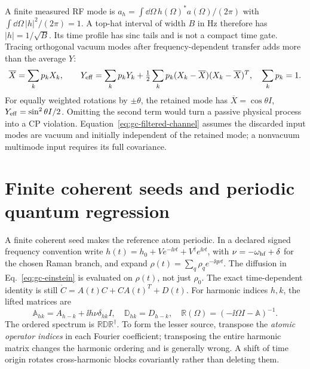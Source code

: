 A finite measured RF mode is
$a_h=\int\dd\Omega\,h(\Omega)^*a(\Omega)/(2\pi)$ with
$\int\dd\Omega\,|h|^2/(2\pi)=1$. A top-hat interval of width $B$ in Hz
therefore has $|h|=1/\sqrt B$. Its time profile has sinc tails and is not a
compact time gate. Tracing orthogonal vacuum modes after frequency-dependent
transfer adds more than the average $Y$:
\begin{equation}
 \overline X=\sum_kp_kX_k,\qquad
 Y_{\rm eff}=\sum_kp_kY_k+\tfrac12\sum_kp_k
             (X_k-\overline X)(X_k-\overline X)^T,
 \quad\sum_kp_k=1.
 \label{eq:gc-filtered-channel}
\end{equation}
For equally weighted rotations by $\pm\theta$, the retained mode has
$\overline X=\cos\theta I$, $Y_{\rm eff}=\sin^2\theta I/2$. Omitting the
second term would turn a passive physical process into a CP violation.
Equation~\eqref{eq:gc-filtered-channel} assumes the discarded input modes are
vacuum and initially independent of the retained mode; a nonvacuum multimode
input requires its full covariance.

\section{Finite coherent seeds and periodic quantum regression}
\label{sec:gc-periodic}

A finite coherent seed makes the reference atom periodic. In a declared signed
frequency convention write $h(t)=h_0+Ve^{-\ii\nu t}+V^\dagger e^{\ii\nu t}$,
with $\nu=-\omega_{\rm hf}+\delta$ for the chosen Raman branch, and expand
$\rho(t)=\sum_q\rho_qe^{-\ii q\nu t}$. The diffusion in
Eq.~\eqref{eq:gc-einstein} is evaluated on $\rho(t)$, not just $\rho_0$.
The exact time-dependent identity is still
$\dot C=A(t)C+CA(t)^T+D(t)$.
For harmonic indices $h,k$, the lifted matrices are
\begin{equation}
 \mathbb A_{hk}=A_{h-k}+\ii h\nu\delta_{hk}I,\quad
 \mathbb D_{hk}=D_{h-k},\quad
 \mathbb R(\Omega)=(-\ii\Omega I-\mathbb A)^{-1}.
 \label{eq:gc-lifted-generator}
\end{equation}
The ordered spectrum is $\mathbb R\mathbb D\mathbb R^\dagger$. To form the
lesser source, transpose the \emph{atomic operator indices} in each Fourier
coefficient; transposing the entire harmonic matrix changes the harmonic
ordering and is generally wrong. A shift of time origin rotates cross-harmonic
blocks covariantly rather than deleting them.


